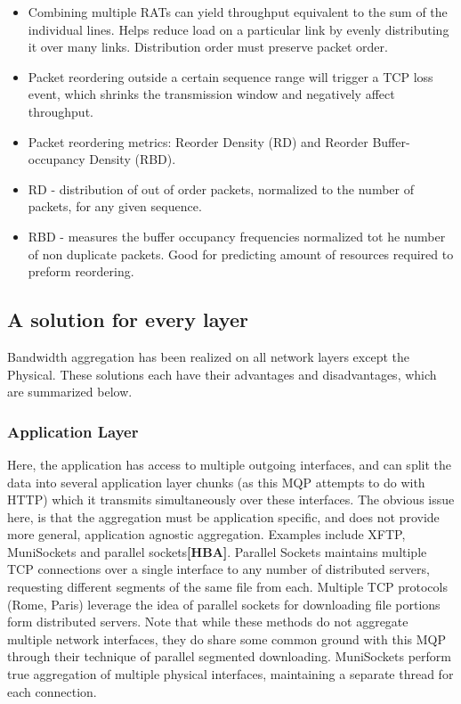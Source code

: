 \documentclass[12pt]{article}
\newcommand{\lcite}[1]
{{\bfseries\color{orange}[#1]}}
\begin{document}
		\begin{itemize}

			\item Combining multiple RATs can yield throughput equivalent to the sum of the individual lines. Helps reduce load on a particular link by evenly distributing it over many links. Distribution order must preserve packet order. 

			\item Packet reordering outside a certain sequence range will trigger a TCP loss event, which shrinks the transmission window and negatively affect throughput.

			\item Packet reordering metrics: Reorder Density (RD) and Reorder Buffer-occupancy Density (RBD). 

			\item RD - distribution of out of order packets, normalized to the number of packets, for any given sequence.

			\item RBD - measures the buffer occupancy frequencies normalized tot he number of non duplicate packets. Good for predicting amount of resources required to preform reordering.

		\end{itemize}

	\subsection{A solution for every layer}

		Bandwidth aggregation has been realized on all network layers except the Physical. These solutions each have their advantages and disadvantages, which are summarized below.

		\subsubsection{Application Layer}
			Here, the application has access to multiple outgoing interfaces, and can split the data into several application layer chunks (as this MQP attempts to do with HTTP) which it transmits simultaneously over these interfaces. The obvious issue here, is that the aggregation must be application specific, and does not provide more general, application agnostic aggregation. Examples include XFTP, MuniSockets and parallel sockets\lcite{HBA}. Parallel Sockets maintains multiple TCP connections over a single interface to any number of distributed servers, requesting different segments of the same file from each. Multiple TCP protocols (Rome, Paris) leverage the idea of parallel sockets for downloading file portions form distributed servers. Note that while these methods do not aggregate multiple network interfaces, they do share some common ground with this MQP through their technique of parallel segmented downloading. MuniSockets perform true aggregation of multiple physical interfaces, maintaining a separate thread for each connection. 
\end{document}
